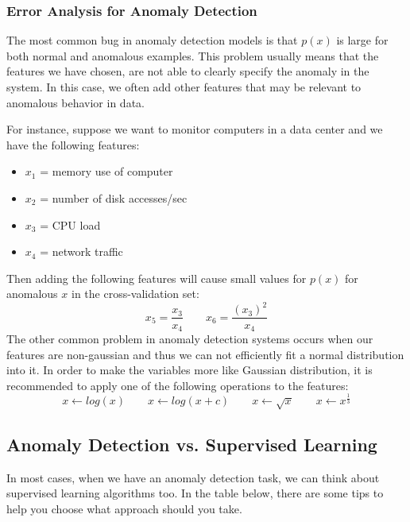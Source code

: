 \documentclass[a4paper, 12pt]{book}
\begin{document}
\subsubsection{Error Analysis for Anomaly Detection}

The most common bug in anomaly detection models is that $p(x)$ is large for both normal and anomalous examples. This problem usually means that the features we have chosen, are not able to clearly specify the anomaly in the system. In this case, we often add other features that may be relevant to anomalous behavior in data.
\newpage

For instance, suppose we want to monitor computers in a data center and we have the following features:

\begin{itemize}
    \item $x_1$ = memory use of computer
    \item $x_2$ = number of disk accesses/sec
    \item $x_3$ = CPU load
    \item $x_4$ = network traffic
\end{itemize}

\noindent Then adding the following features will cause small values for $p(x)$ for anomalous $x$ in the cross-validation set:
\[ x_5 = \frac{x_3}{x_4} \qquad x_6 = \frac{(x_3)^2}{x_4} \]
The other common problem in anomaly detection systems occurs when our features are non-gaussian and thus we can not efficiently fit a normal distribution into it. In order to make the variables more like Gaussian distribution, it is recommended to apply one of the following operations to the features:
\[x \gets log(x) \qquad x \gets log(x + c) \qquad x \gets \sqrt{x} \qquad x \gets x^{\frac{1}{3}} \]

\subsection{Anomaly Detection vs. Supervised Learning}

In most cases, when we have an anomaly detection task, we can think about supervised learning algorithms too. In the table below, there are some tips to help you choose what approach should you take.
\end{document}
